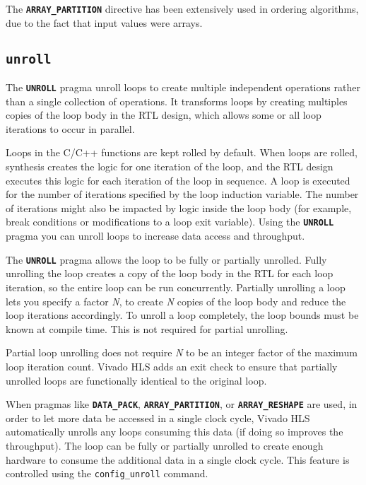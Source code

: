 The \texttt{\textbf{ARRAY\_PARTITION}} directive has been extensively used in ordering algorithms, due to the fact that input values were arrays.

\subsection{\texttt{\textbf{unroll}}}

The \texttt{\textbf{UNROLL}} pragma unroll loops to create multiple independent operations rather than a single collection of operations. It transforms loops by creating multiples copies of the loop body in the RTL design, which allows some or all loop iterations to occur in parallel.

Loops in the C/C++ functions are kept rolled by default. When loops are rolled, synthesis creates the logic for one iteration of the loop, and the RTL design executes this logic for each iteration of the loop in sequence. A loop is executed for the number of iterations specified by the loop induction variable. The number of iterations might also be impacted by logic inside the loop body (for example, break conditions or modifications to a loop exit variable). Using the \texttt{\textbf{UNROLL}} pragma you can unroll loops to increase data access and throughput.

The \texttt{\textbf{UNROLL}} pragma allows the loop to be fully or partially unrolled. Fully unrolling the loop creates a copy of the loop body in the RTL for each loop iteration, so the entire loop can be run concurrently. Partially unrolling a loop lets you specify a factor \textit{N}, to create \textit{N} copies of the loop body and reduce the loop iterations accordingly. To unroll a loop completely, the loop bounds must be known at compile time. This is not required for partial unrolling.

Partial loop unrolling does not require \textit{N} to be an integer factor of the maximum loop iteration count. Vivado HLS adds an exit check to ensure that partially unrolled loops are functionally identical to the original loop.

When pragmas like \texttt{\textbf{DATA\_PACK}}, \texttt{\textbf{ARRAY\_PARTITION}}, or \texttt{\textbf{ARRAY\_RESHAPE}} are used, in order to let more data be accessed in a single clock cycle, Vivado HLS automatically unrolls any loops consuming this data (if doing so improves the throughput). The loop can be fully or partially unrolled to create enough hardware to consume the additional data in a single clock cycle. This feature is controlled using the \texttt{config\_unroll} command.

